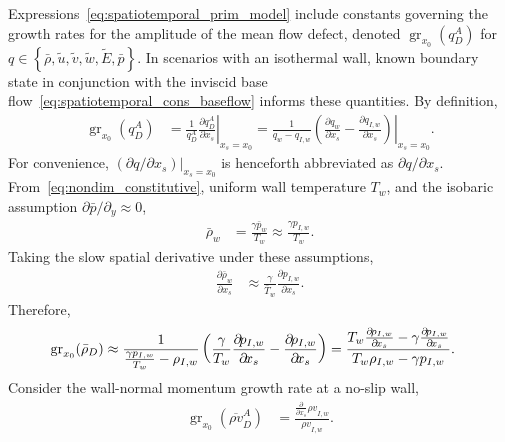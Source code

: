 Expressions~\eqref{eq:spatiotemporal_prim_model} include constants governing the
growth rates for the amplitude of the mean flow defect, denoted
$\operatorname{gr}_{x_0}\!\left(q_D^A\right)$ for
$q\in\left\{\bar{\rho},\tilde{u},\tilde{v},\tilde{w},\tilde{E},\bar{p}\right\}$.
In scenarios with an isothermal wall, known boundary state in conjunction with
the inviscid base flow~\eqref{eq:spatiotemporal_cons_baseflow} informs these
quantities.  By definition,
\begin{align}
    \label{eq:gramp_mean}
    \operatorname{gr}_{x_0}\!\left(q_D^A\right)
    &=
    \left.
    \frac{1}{q_D^A}
    \frac{\partial\!q_D^A}{\partial\!x_s}
    \right|_{x_s=x_0}
    =
    \left.
    \frac{1}{q_{w} - q_{I,w}}
    \left(
          \frac{\partial\!q_{w}  }{\partial\!x_s}
        - \frac{\partial\!q_{I,w}}{\partial\!x_s}
    \right)
    \right|_{x_s=x_0}.
\end{align}
%
For convenience, $\left.\left(\partial\!q / \partial\!x_s\right)\right|_{x_s = x_0}$ is
henceforth abbreviated as $\partial\!q / \partial\!x_s$.
%
From~\eqref{eq:nondim_constitutive}, uniform wall temperature $T_w$, and the
isobaric assumption $\partial\!\bar{p} / \partial\!_y \approx 0$,
\begin{align}
    \bar{\rho}_w
    &= \frac{\gamma \bar{p}_{w}}{T_w}
    \approx \frac{\gamma p_{I,w}}{T_w}.
\end{align}
Taking the slow spatial derivative under these assumptions,
\begin{align}
    \frac{\partial\!\bar{\rho}_w }{\partial\!x_s}
    &\approx \frac{\gamma}{\bar{T}_w} \frac{\partial\!p_{I,w}}{\partial\!x_s}.
\end{align}
Therefore,
\begin{align}
    \label{eq:gramp_mean_rho}
    \operatorname{gr}_{x_0}\!\left(\bar{\rho}_{D}\right)
    &\approx
    \frac{1}{\frac{\gamma p_{I,w}}{T_w} - {\rho}_{I,w}}
    \left(
          \frac{\gamma}{T_w} \frac{\partial\!{p   }_{I,w} }{\partial\!x_s}
        -                    \frac{\partial\!{\rho}_{I,w} }{\partial\!x_s}
    \right)
    =
    \frac{%
          T_w    \frac{\partial\!\rho_{I,w}}{\partial\!x_s}
        - \gamma \frac{\partial\!   p_{I,w}}{\partial\!x_s}
    }{%
          T_w \rho_{I,w} - \gamma p_{I,w}
      }.
\end{align}
%
Consider the wall-normal momentum growth rate at a no-slip wall,
\begin{align}
    \operatorname{gr}_{x_0}\!\left(\overline{\rho v}_D^A\right)
    &=
    \frac{\frac{\partial\!}{\partial\!x_s} {\rho v}_{I,w}}{{\rho v}_{I,w}}.
\end{align}
